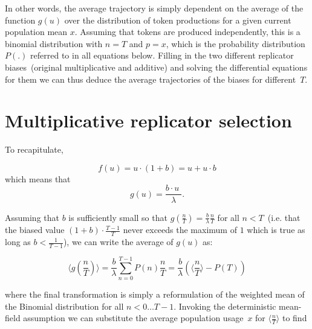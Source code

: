 In other words, the average trajectory is simply dependent on the average of the function $g(u)$ over the distribution of token productions for a given current population mean $x$. Assuming that tokens are produced independently, this is a binomial distribution with $n=T$ and $p=x$, which is the probability distribution~$P(.)$ referred to in all equations below. Filling in the two different replicator biases~(original multiplicative and additive) and solving the differential equations for them we can thus deduce the average trajectories of the biases for different~$T$.

\section{Multiplicative replicator selection}

To recapitulate,

$$f(u) = u\cdot(1+b) = u + u\cdot b$$
which means that
$$g(u) = \frac{b\cdot u\;}{\lambda}.$$

Assuming that $b$ is sufficiently small so that $g(\frac{n}{T})=\frac{b}{\lambda}\frac{n}{T}$ for all $n<T$~(i.e. that the biased value $(1+b)\cdot\frac{T-1}{T}$ never exceeds the maximum of $1$ which is true as long as $b<\frac{1}{T-1}$), we can write the average of $g(u)$ as:

$$\langle g(\frac{n}{T})\rangle=\frac{b}{\lambda}\sum_{n=0}^{T-1} P(n)\frac{n}{T}=\frac{b}{\lambda}(\langle\frac{n}{T}\rangle - P(T))$$

where the final transformation is simply a reformulation of the weighted mean of the Binomial distribution for all $n<0\ldots T-1$. Invoking the deterministic mean-field assumption we can substitute the average population usage~$x$ for $\langle\frac{n}{T}\rangle$ to find

